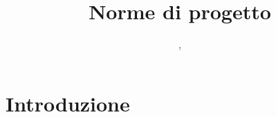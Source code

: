 


\author{\GG, \MM}
\supervisor{\LB, \AZ}
\dest{\ALL}
\title{Norme di progetto}




\maketitle
\setcounter{page}{2}

\tableofcontents
\newpage




\section{Introduzione}

